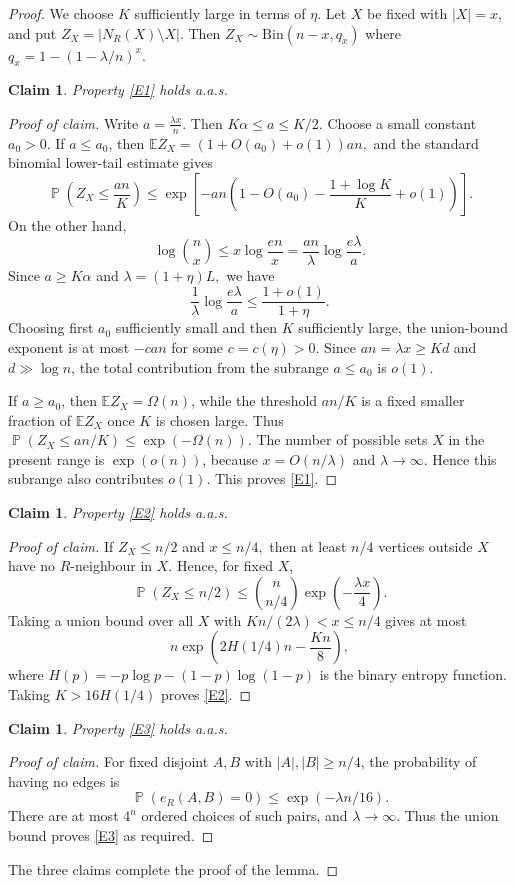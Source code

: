 \documentclass[11pt,reqno]{amsart}
\newenvironment{poc}{\begin{proof}[Proof of claim]\renewcommand*{\qedsymbol}{$\blacksquare$}}{\end{proof}}
\newtheorem{claim}[theorem]{Claim}
\theoremstyle{definition}
\theoremstyle{remark}
\renewcommand\Pr{\operatorname{\mathbb{P}}}
\renewcommand\le{\leqslant}
\renewcommand\ge{\geqslant}
\begin{document}
\begin{proof}
We choose $K$ sufficiently large in terms of $\eta$. Let $X$ be fixed with $|X|=x$, and put $Z_{X}=|N_{R}(X)\setminus X|$. Then $Z_{X}\sim \text{Bin}(n-x,q_{x})$ where $q_{x}=1-(1-\lambda/n)^{x}$.

\begin{claim}\label{claim:e1}
Property \ref{E1} holds a.a.s.
\end{claim}
\begin{poc}
Write $a=\frac{\lambda x}{n}$. Then $K\alpha \le a\le K/2$. Choose a small constant $a_{0}>0$. If $a\le a_{0}$, then $\mathbb{E}Z_{X}=(1+O(a_{0})+o(1))an,$ and the standard binomial lower-tail estimate gives
$$\Pr\left(Z_{X}\le\frac{an}{K}\right)\le \exp\left[-an\left(1-O(a_{0})-\frac{1+\log K}{K}+o(1)\right)\right].$$
On the other hand,
$$\log\binom{n}{x}\le x \log\frac{en}{x}=\frac{an}{\lambda}\log\frac{e\lambda}{a}.$$
Since $a\ge K\alpha$ and $\lambda=(1+\eta)L,$ we have
$$\frac{1}{\lambda}\log\frac{e\lambda}{a}\le\frac{1+o(1)}{1+\eta}.$$
Choosing first $a_{0}$ sufficiently small and then $K$ sufficiently large, the union-bound exponent is at most $-can$ for some $c=c(\eta)>0$. Since $an=\lambda x\ge Kd$ and $d\gg \log n$, the total contribution from the subrange $a\le a_{0}$ is $o(1)$.

If $a\ge a_{0}$, then $\mathbb{E}Z_{X}=\Omega(n)$, while the threshold $an/K$ is a fixed smaller fraction of $\mathbb{E}Z_{X}$ once $K$ is chosen large. Thus $\Pr(Z_{X}\le an/K)\le \exp(-\Omega(n))$. The number of possible sets $X$ in the present range is $\exp(o(n))$, because $x=O(n/\lambda)$ and $\lambda\rightarrow\infty$. Hence this subrange also contributes $o(1)$. This proves \ref{E1}.
\end{poc}

\begin{claim}\label{claim:e2}
Property \ref{E2} holds a.a.s.
\end{claim}
\begin{poc}
If $Z_{X}\le n/2$ and $x\le n/4,$ then at least $n/4$ vertices outside $X$ have no $R$-neighbour in $X$. Hence, for fixed $X$,
$$\Pr(Z_{X}\le n/2)\le\binom{n}{n/4}\exp\left(-\frac{\lambda x}{4}\right).$$
Taking a union bound over all $X$ with $Kn/(2\lambda)<x\le n/4$ gives at most
$$n \exp\left(2H(1/4)n-\frac{Kn}{8}\right),$$
where $H(p)=-p\log p-(1-p)\log(1-p)$ is the binary entropy function. Taking $K>16H(1/4)$ proves \ref{E2}.
\end{poc}

\begin{claim}\label{claim:e3}
Property \ref{E3} holds a.a.s.
\end{claim}
\begin{poc}
For fixed disjoint $A, B$ with $|A|,|B|\ge n/4$, the probability of having no edges is
$$\Pr(e_{R}(A,B)=0)\le \exp(-\lambda n/16).$$
There are at most $4^{n}$ ordered choices of such pairs, and $\lambda\rightarrow\infty$. Thus the union bound proves \ref{E3} as required.
\end{poc}

The three claims complete the proof of the lemma.
\end{proof}
\end{document}
